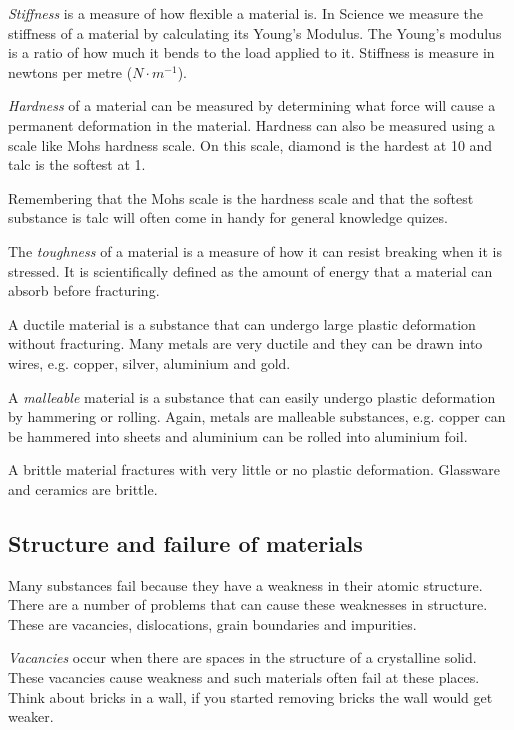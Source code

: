 \emph{Stiffness} is a measure of how flexible a material is. In Science we measure the stiffness of a material by calculating its Young's Modulus. The Young's modulus is a ratio of how much it bends to the load applied to it. Stiffness is measure in newtons per metre ($N \cdot m^{-1}$).
 
\emph{Hardness} of a material can be measured by determining what force will cause a permanent deformation in the material. Hardness can also be measured using a scale like Mohs hardness scale. On this scale, diamond is the hardest at 10 and talc is the softest at 1.

\begin{IFact}{Remembering that the Mohs scale is the hardness scale and that the softest substance is talc will often come in handy for general knowledge quizes.}\end{IFact}

The \emph{toughness} of a material is a measure of how it can resist breaking when it is stressed. It is scientifically defined as the amount of energy that a material can absorb before fracturing.

A ductile material is a substance that can undergo large plastic deformation without fracturing. Many metals are very ductile and they can be drawn into wires, e.g. copper, silver, aluminium and gold.

A \emph{malleable} material is a substance that can easily undergo plastic deformation by hammering or rolling. Again, metals are malleable substances, e.g. copper can be hammered into sheets and aluminium can be rolled into aluminium foil.
 
A brittle material fractures with very little or no plastic deformation. Glassware and ceramics are brittle.

\subsection{Structure and failure of materials}

Many substances fail because they have a weakness in their atomic structure. There are a number of problems that can cause these weaknesses in structure. These are vacancies, dislocations, grain boundaries and impurities.

\emph{Vacancies} occur when there are spaces in the structure of a crystalline solid. These vacancies cause weakness and such materials often fail at these places. Think about bricks in a wall, if you started removing bricks the wall would get weaker.

